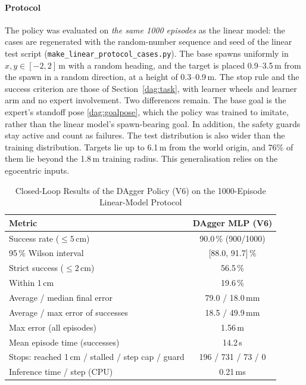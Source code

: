 \documentclass[conference]{IEEEtran}
\begin{document}
\paragraph{Protocol} The policy was evaluated on \emph{the same 1000 episodes} as the linear model: the cases are regenerated with the random-number sequence and seed of the linear test script (\texttt{make\_linear\_protocol\_cases.py}). The base spawns uniformly in $x,y\in[-2,2]$\,m with a random heading, and the target is placed 0.9--3.5\,m from the spawn in a random direction, at a height of 0.3--0.9\,m. The stop rule and the success criterion are those of Section~\ref{dag:task}, with learner wheels and learner arm and no expert involvement. Two differences remain. The base goal is the expert's standoff pose \eqref{dag:goalpose}, which the policy was trained to imitate, rather than the linear model's spawn-bearing goal. In addition, the safety guards stay active and count as failures. The test distribution is also wider than the training distribution. Targets lie up to 6.1\,m from the world origin, and 76\% of them lie beyond the 1.8\,m training radius. This generalisation relies on the egocentric inputs.

\begin{table}[t]
\caption{Closed-Loop Results of the DAgger Policy (V6) on the 1000-Episode Linear-Model Protocol}
\label{dag:tab:results}
\centering
\footnotesize
\renewcommand{\arraystretch}{1.12}
\begin{tabular}{@{}lc@{}}
\toprule
\textbf{Metric} & \textbf{DAgger MLP (V6)}\\
\midrule
Success rate ($\le 5$\,cm) & 90.0\,\% (900/1000)\\
95\,\% Wilson interval & [88.0, 91.7]\,\%\\
Strict success ($\le 2$\,cm) & 56.5\,\%\\
Within 1\,cm & 19.6\,\%\\
Average / median final error & 79.0 / 18.0\,mm\\
Average / max error of successes & 18.5 / 49.9\,mm\\
Max error (all episodes) & 1.56\,m\\
Mean episode time (successes) & 14.2\,s\\
Stops: reached 1\,cm / stalled / step cap / guard & 196 / 731 / 73 / 0\\
Inference time / step (CPU) & 0.21\,ms\\
\bottomrule
\end{tabular}
\end{table}
\end{document}
